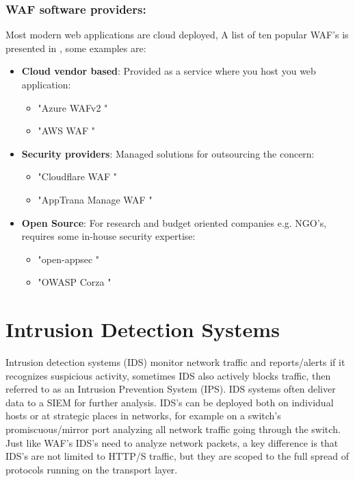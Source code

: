 \documentclass[
	letterpaper, %
	10pt, %
	unnumberedsections, %
	twoside, %
]{APAAssignment}
\begin{document}
\subsubsection{WAF software providers:}
Most modern web applications are cloud deployed, A list of ten popular WAF's is presented in \cite{OpenappsecWaf}, some examples are: 

\begin{itemize}
	
	\item{\textbf{Cloud vendor based}: Provided as a service where you host you web application: 
	\begin{itemize}
		\item "Azure WAFv2 \cite{AzureWAF}"
		\item "AWS WAF \cite{AWSWAF}"
	\end{itemize}
	}
	
	\item{\textbf{Security providers}: Managed solutions for outsourcing the concern:
	\begin{itemize}
		\item "Cloudflare WAF \cite{CloudflareWAF}"
		\item "AppTrana Manage WAF \cite{AppTrana-WAF}"
	\end{itemize}
	}
	
	\item{
		\textbf{Open Source}: For research and budget oriented companies e.g. NGO's, requires some in-house security expertise: 
		\begin{itemize}
			\item "open-appsec \cite{open-appsec}"
			\item "OWASP Corza \cite{OWASPcorsa}"
		\end{itemize}
	} 
\end{itemize}


\section{Intrusion Detection Systems}
Intrusion detection systems (IDS) monitor network traffic and reports/alerts if it recognizes suspicious activity, sometimes IDS also actively blocks traffic, then referred to as an Intrusion Prevention System (IPS). IDS systems often deliver data to a SIEM for further analysis. IDS's can be deployed both on individual hosts or at strategic places in networks, for example on a switch's promiscuous/mirror port analyzing all network traffic going through the switch. Just like WAF's IDS's need to analyze network packets, a key difference is that IDS's are not limited to HTTP/S traffic, but they are scoped to the full spread of protocols running on the transport layer.
\end{document}
